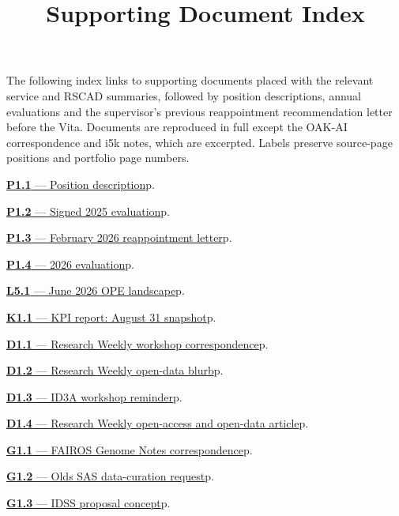 \title{Supporting Document Index}
\portfoliotitle
The following index links to supporting documents placed with the relevant
service and RSCAD summaries, followed by position descriptions, annual evaluations
and the supervisor's previous reappointment recommendation letter before the Vita.
Documents are reproduced in full except the OAK-AI correspondence and i5k notes,
which are excerpted. Labels preserve source-page positions and portfolio page numbers.
\par\medskip
\noindent\hyperref[supplement-P1.1]{\textbf{P1.1} --- Position description}\hfill p.~\pageref{supplement-P1.1}\par
\noindent\hyperref[supplement-P1.2]{\textbf{P1.2} --- Signed 2025 evaluation}\hfill p.~\pageref{supplement-P1.2}\par
\noindent\hyperref[supplement-P1.3]{\textbf{P1.3} --- February 2026 reappointment letter}\hfill p.~\pageref{supplement-P1.3}\par
\noindent\hyperref[supplement-P1.4]{\textbf{P1.4} --- 2026 evaluation}\hfill p.~\pageref{supplement-P1.4}\par
\noindent\hyperref[supplement-L5.1]{\textbf{L5.1} --- June 2026 OPE landscape}\hfill p.~\pageref{supplement-L5.1}\par
\noindent\hyperref[supplement-K1.1]{\textbf{K1.1} --- KPI report: August 31 snapshot}\hfill p.~\pageref{supplement-K1.1}\par
\noindent\hyperref[supplement-D1.1]{\textbf{D1.1} --- Research Weekly workshop correspondence}\hfill p.~\pageref{supplement-D1.1}\par
\noindent\hyperref[supplement-D1.2]{\textbf{D1.2} --- Research Weekly open-data blurb}\hfill p.~\pageref{supplement-D1.2}\par
\noindent\hyperref[supplement-D1.3]{\textbf{D1.3} --- ID3A workshop reminder}\hfill p.~\pageref{supplement-D1.3}\par
\noindent\hyperref[supplement-D1.4]{\textbf{D1.4} --- Research Weekly open-access and open-data article}\hfill p.~\pageref{supplement-D1.4}\par
\noindent\hyperref[supplement-G1.1]{\textbf{G1.1} --- FAIROS Genome Notes correspondence}\hfill p.~\pageref{supplement-G1.1}\par
\noindent\hyperref[supplement-G1.2]{\textbf{G1.2} --- Olds SAS data-curation request}\hfill p.~\pageref{supplement-G1.2}\par
\noindent\hyperref[supplement-G1.3]{\textbf{G1.3} --- IDSS proposal concept}\hfill p.~\pageref{supplement-G1.3}\par

